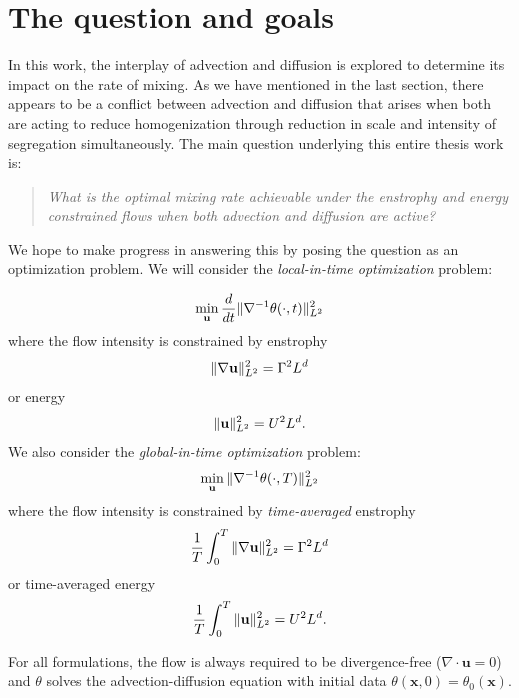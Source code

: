 		
\section{The question and goals}

In this work, the interplay of advection and diffusion is explored to determine its impact on the rate of mixing. As we have mentioned in the last section, there appears to be a conflict between advection and diffusion that arises when both are acting to reduce homogenization through reduction in scale and intensity of segregation simultaneously.  The main question underlying this entire thesis work is:

\begin{quote}
{\it What is the optimal mixing rate achievable under the enstrophy and energy constrained flows when both advection and diffusion are active? }
\end{quote}

We hope to make progress in answering this by posing the question as an optimization problem. We will consider the {\it local-in-time optimization} problem:

\begin{equation} 
\min_{\mathbf{u}} \frac{d }{dt}\|\nabla^{-1} \theta(\cdot, t) \|_{L^{2}}^2
\end{equation}
where the flow intensity is constrained by enstrophy \begin{equation}
\|\nabla\mathbf{u}\|_{L^{2}}^2 =\Gamma^2 L^{d}
\end{equation} or energy
\begin{equation} 
\|\mathbf{u}\|_{L^{2}}^2 = U^2L^{d}.
\end{equation}
%
We also consider the {\it global-in-time optimization } problem:
%
\begin{equation} 
\min_{\mathbf{u}} \|\nabla^{-1} \theta (\cdot, T) \|_{L^{2}}^2
\end{equation}
%
where the flow intensity is constrained by {\it time-averaged} enstrophy \begin{equation}
\frac{1}{T}\int_0^T\|\nabla\mathbf{u}\|_{L^{2}}^2 = \Gamma^2 L^{d}
\end{equation} or time-averaged energy
\begin{equation} 
\frac{1}{T}\int_0^T \|\mathbf{u}\|_{L^{2}}^2 = U^2L^{d}.
\end{equation}

For all formulations, the flow is always required to be divergence-free ($\nabla \cdot \mathbf{u} = 0$) and $\theta$ solves the advection-diffusion equation with initial data $\theta(\mathbf{x},0)=\theta_0(\mathbf{x})$.

